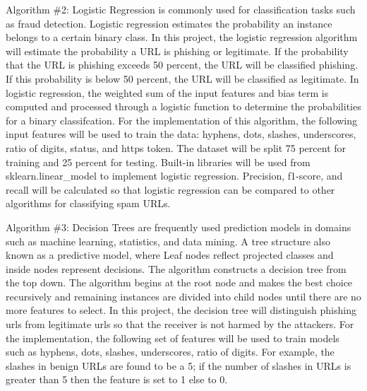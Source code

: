 \documentclass[conference]{IEEEtran}
\begin{document}
Algorithm \#2: Logistic Regression is commonly used for classification tasks such as fraud detection. Logistic regression estimates the probability an instance belongs to a certain binary class. In this project, the logistic regression algorithm will estimate the probability a URL is phishing or legitimate. If the probability that the URL is phishing exceeds 50 percent, the URL will be classified phishing. If this probability is below 50 percent, the URL will be classified as legitimate. In logistic regression, the weighted sum of the input features and bias term is computed and processed through a logistic function to determine the probabilities for a binary classifcation. For the implementation of this algorithm, the following input features will be used to train the data: hyphens, dots, slashes, underscores, ratio of digits, status, and https token. The dataset will be split 75 percent for training and 25 percent for testing. Built-in libraries will be used from sklearn.linear_model to implement logistic regression. Precision, f1-score, and recall will be calculated so that logistic regression can be compared to other algorithms for classifying spam URLs. 

Algorithm \#3: Decision Trees are frequently used prediction models in domains such as machine learning, statistics, and data mining. A tree structure also known as a predictive model, where Leaf nodes reflect projected classes and inside nodes represent decisions. The algorithm constructs a decision tree from the top down. The algorithm begins at the root node and makes the best choice recursively and remaining instances are divided into child nodes until there are no more features to select. In this project, the decision tree will distinguish phishing urls from legitimate urls so that the receiver is not harmed by the attackers.  For the implementation, the following set of features will be used to train models such as  hyphens, dots, slashes, underscores, ratio of digits. For example, the slashes in benign URLs are found to be a 5; if the number of slashes in URLs is greater than 5 then the feature is set to 1 else to 0.
\end{document}
